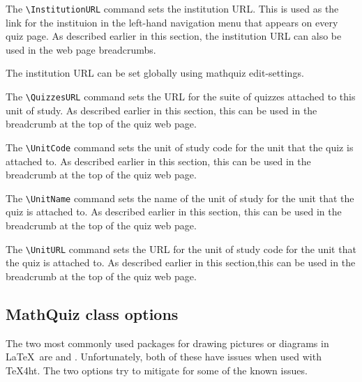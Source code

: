 \documentclass[svgnames]{article}
\newcommand\ddash{\texttt{\textemdash\textemdash}}
\newcommand\mathquizopt[1]{\textsf{mathquiz \ddash#1}}
\begin{document}
\begin{description}
    The \Verb|\InstitutionURL| command sets the institution URL. This is
    used as the link for the \textsf{instituion} in the left-hand
    navigation menu that appears on every quiz page.  As described
    earlier in this section, the institution URL can also be used in the
    web page breadcrumbs.

    The institution URL can be set globally using \mathquizopt{edit-settings}.

    The \Verb|\QuizzesURL| command sets the URL for the suite of quizzes attached to this unit of study. As described earlier in this section,
    this can be used in the breadcrumb at the top of the
    quiz web page.

    The \Verb|\UnitCode| command sets the unit of study code for the
    unit that the quiz is attached to. As described earlier in this
    section, this can be used in the breadcrumb at the top of the quiz
    web page.

    The \Verb|\UnitName| command sets the name of the unit of study for
    the unit that the quiz is attached to. As described earlier in this
    section, this can be used in the breadcrumb at the top of the quiz
    web page.

    The \Verb|\UnitURL| command sets the URL for the unit of study code
    for the unit that the quiz is attached to. As described earlier in
    this section,this can be used in the breadcrumb at the top of the
    quiz web page.

\end{description}

  \subsection{MathQuiz class options}\label{SS:classOptions}

The two most commonly used packages for drawing pictures or diagrams in
\LaTeX\ are  and . Unfortunately, both of
these have issues when used with \TeX 4ht. The two \MathQuiz options try
to mitigate for some of the known issues.
\end{document}
